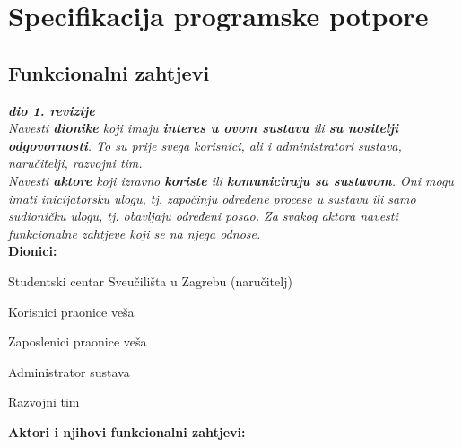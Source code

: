 \chapter{Specifikacija programske potpore}
		
	\section{Funkcionalni zahtjevi}
			
			\textbf{\textit{dio 1. revizije}}\\
			
			\textit{Navesti \textbf{dionike} koji imaju \textbf{interes u ovom sustavu} ili  \textbf{su nositelji odgovornosti}. To su prije svega korisnici, ali i administratori sustava, naručitelji, razvojni tim.}\\
				
			\textit{Navesti \textbf{aktore} koji izravno \textbf{koriste} ili \textbf{komuniciraju sa sustavom}. Oni mogu imati inicijatorsku ulogu, tj. započinju određene procese u sustavu ili samo sudioničku ulogu, tj. obavljaju određeni posao. Za svakog aktora navesti funkcionalne zahtjeve koji se na njega odnose.}\\
			
			
			\noindent \textbf{Dionici:}
			
			\begin{packed_enum}
				
				\item Studentski centar Sveučilišta u Zagrebu (naručitelj)
				\item Korisnici praonice veša				
				\item Zaposlenici praonice veša
				\item Administrator sustava
				\item Razvojni tim
				
			\end{packed_enum}
			
			\noindent \textbf{Aktori i njihovi funkcionalni zahtjevi:}
			
